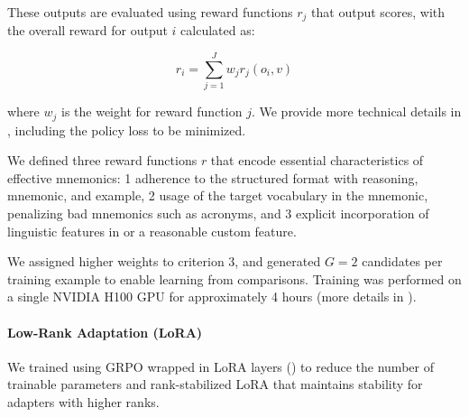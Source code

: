 These outputs are evaluated using reward functions $r_j$ that output scores, with the overall reward for output $i$ calculated as:

\begin{equation}
r_i = \sum_{j=1}^{J} w_j r_j(o_i, v)
\end{equation}

where $w_j$ is the weight for reward function $j$. We provide more technical details in , including the policy loss to be minimized.

We defined three reward functions $r$ that encode essential characteristics of effective mnemonics:
\numlist{1} adherence to the structured format with reasoning, mnemonic, and example,
\numlist{2} usage of the target vocabulary in the mnemonic, penalizing bad mnemonics such as acronyms, and
\numlist{3} explicit incorporation of linguistic features in  or a reasonable custom feature.

We assigned higher weights to criterion 3, and generated $G=2$ candidates per training example to enable learning from comparisons. Training was performed on a single NVIDIA H100 GPU for approximately 4 hours (more details in ).

\paragraph*{Low-Rank Adaptation (LoRA)} We trained \studentmodel using GRPO wrapped in LoRA layers () to reduce the number of trainable parameters and rank-stabilized LoRA that maintains stability for adapters with higher ranks.
